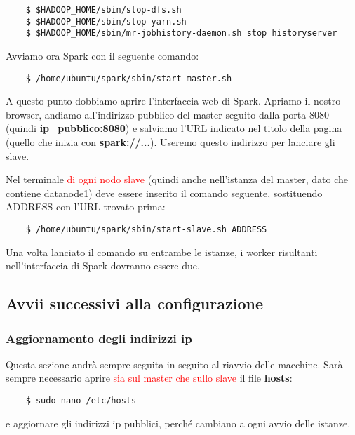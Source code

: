 \begin{verbatim}
    $ $HADOOP_HOME/sbin/stop-dfs.sh
    $ $HADOOP_HOME/sbin/stop-yarn.sh
    $ $HADOOP_HOME/sbin/mr-jobhistory-daemon.sh stop historyserver
\end{verbatim}

Avviamo ora Spark con il seguente comando:

\begin{verbatim}
    $ /home/ubuntu/spark/sbin/start-master.sh
\end{verbatim}

A questo punto dobbiamo aprire l'interfaccia web di Spark. Apriamo il nostro browser, andiamo all'indirizzo pubblico del master seguito dalla porta 8080 (quindi \textbf{ip\_pubblico:8080}) e salviamo l'URL indicato nel titolo della pagina (quello che inizia con \textbf{spark://...}). Useremo questo indirizzo per lanciare gli slave.

Nel terminale \textcolor{red}{di ogni nodo slave} (quindi anche nell'istanza del master, dato che contiene datanode1) deve essere inserito il comando seguente, sostituendo ADDRESS con l'URL trovato prima:

\begin{verbatim}
    $ /home/ubuntu/spark/sbin/start-slave.sh ADDRESS
\end{verbatim}

Una volta lanciato il comando su entrambe le istanze, i worker risultanti nell'interfaccia di Spark dovranno essere due.



\subsection{Avvii successivi alla configurazione}


\subsubsection{Aggiornamento degli indirizzi ip}

Questa sezione andrà sempre seguita in seguito al riavvio delle macchine. Sarà sempre necessario aprire \textcolor{red}{sia sul master che sullo slave} il file \textbf{hosts}:

\begin{verbatim}
    $ sudo nano /etc/hosts
\end{verbatim}

e aggiornare gli indirizzi ip pubblici, perché cambiano a ogni avvio delle istanze.


